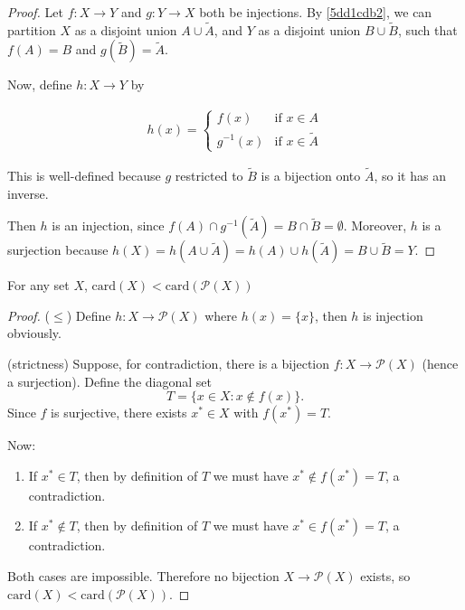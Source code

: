 \begin{proof}
    Let $f: X \to Y$ and $g: Y \to X$ both be injections.
    By \cref{5dd1cdb2}, we can partition $X$ as a disjoint union $A \cup \tilde{A}$, and $Y$
    as a disjoint union $B \cup \tilde{B}$, such that $f(A) = B$ and $g(\tilde{B}) = \tilde{A}$.

    Now, define $h: X \to Y$ by

    \begin{align*}
        h(x) = \begin{cases}
            f(x) & \text{if } x \in A\\
            g^{-1}(x) & \text{if } x \in \tilde{A}
        \end{cases}
    \end{align*}

    This is well-defined because $g$ restricted to $\tilde{B}$ is a bijection onto $\tilde{A}$, so it has an inverse.

    Then $h$ is an injection, since $f(A) \cap g^{-1}(\tilde{A}) = B \cap \tilde{B} = \emptyset$. Moreover, $h$
    is a surjection because $h(X) = h(A \cup \tilde{A}) = h(A) \cup h(\tilde{A}) = B \cup \tilde{B} = Y$.
\end{proof}

\begin{prop}
For any set $X$, $\mathrm{card}(X) < \mathrm{card}(\mathscr{P}(X))$
\end{prop}

\begin{proof}
    ($\le$) Define $h: X \to \mathscr{P}(X)$ where $h(x) = \{x\}$, then $h$ is injection obviously.


(strictness) Suppose, for contradiction, there is a bijection $f:X\to\mathscr{P}(X)$
(hence a surjection). Define the diagonal set
\[
T=\{x\in X: x\notin f(x)\}.
\]
Since $f$ is surjective, there exists $x^*\in X$ with $f(x^*)=T$.

Now:

\begin{enumerate}
    \item If $x^*\in T$, then by definition of $T$ we must have $x^*\notin f(x^*)=T$,
  a contradiction.

    \item If $x^*\notin T$, then by definition of $T$ we must have $x^*\in f(x^*)=T$,
  a contradiction.

\end{enumerate}
Both cases are impossible. Therefore no bijection $X\to\mathscr{P}(X)$ exists, so
$\mathrm{card}(X)<\mathrm{card}(\mathscr{P}(X))$.
\end{proof}


